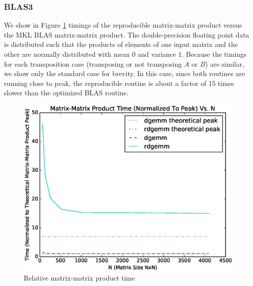   \subsubsection{BLAS3}
    We show in Figure \ref{fig:gemm_timings} timings of the reproducible matrix-matrix product versus the MKL BLAS matrix-matrix product. The double-precision floating point data is distributed such that the products of elements of one input matrix and the other are normally distributed with mean $0$ and variance $1$. Because the timings for each transposition case (transposing or not transposing $A$ or $B$) are similar, we show only the standard case for brevity. In this case, since both routines are running close to peak, the reproducible routine is about a factor of 15 times slower than the optimized BLAS routine.
  \begin{figure}[H]
  \begin{center}
  \includegraphics[width=\textwidth]{plots/gemm_comparison}
  \caption{Relative matrix-matrix product time}
  \label{fig:gemm_timings}
  \end{center}
  \end{figure}
